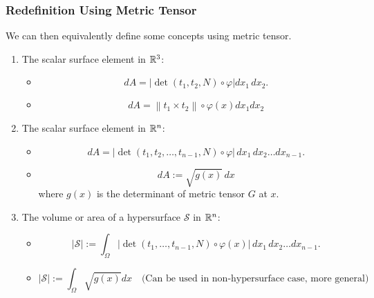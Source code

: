 \documentclass[10pt, t]{beamer}
\begin{document}
\begin{frame}
    \frametitle{Redefinition Using Metric Tensor}
    We can then equivalently define some concepts using metric tensor.

    \begin{enumerate}
        \item The scalar surface element in $\mathbb{R}^3$:
              \begin{itemize}
                  \item \[dA=|\det(t_1,t_2,N)\circ\varphi|dx_1\,dx_2.\]
                  \item $$d A=\left\|t_{1} \times t_{2}\right\| \circ \varphi(x) d x_{1} d x_{2}$$
              \end{itemize}
        \item The scalar surface element in $\mathbb{R}^n$:
              \begin{itemize}
                  \item \[dA=|\det(t_1,t_2,\ldots,t_{n-1},N)\circ
                            \varphi|\,dx_1\,dx_2\ldots dx_{n-1}.\]
                  \item     \[dA:=\sqrt{g(x)}\,dx\] where $g(x)$ is the determinant of metric tensor $G$ at $x$.
              \end{itemize}
        \item The volume or area of a hypersurface $\mathcal{S}$ in $\mathbb{R}^n$:
              \begin{itemize}
                  \item \[|\mathcal{S}|:=\int_\Omega|\det(t_1,\ldots,t_{n-1},N)
                            \circ\varphi(x)|\,dx_1\,dx_2\ldots dx_{n-1}.\]
                  \item    \[|\mathcal{S}|:=\int_\Omega\sqrt{g(x)}dx \quad\text{(Can be used in non-hypersurface case, more general)}\]
              \end{itemize}
    \end{enumerate}
\end{frame}
\end{document}
